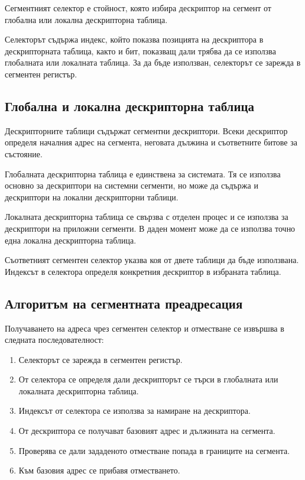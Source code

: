 \begin{defn}
Сегментният селектор е стойност, която избира дескриптор на сегмент от глобална или локална дескрипторна таблица.
\end{defn}

Селекторът съдържа индекс, който показва позицията на дескриптора в дескрипторната таблица, както и бит, показващ дали трябва да се използва глобалната или локалната таблица. За да бъде използван, селекторът се зарежда в сегментен регистър.

\subsection{Глобална и локална дескрипторна таблица}\label{s:10.3.2}

Дескрипторните таблици съдържат сегментни дескриптори. Всеки дескриптор определя началния адрес на сегмента, неговата дължина и съответните битове за състояние.

Глобалната дескрипторна таблица е единствена за системата. Тя се използва основно за дескриптори на системни сегменти, но може да съдържа и дескриптори на локални дескрипторни таблици.

Локалната дескрипторна таблица се свързва с отделен процес и се използва за дескриптори на приложни сегменти. В даден момент може да се използва точно една локална дескрипторна таблица.

Съответният сегментен селектор указва коя от двете таблици да бъде използвана. Индексът в селектора определя конкретния дескриптор в избраната таблица.

\subsection{Алгоритъм на сегментната преадресация}\label{s:10.3.3}

Получаването на адреса чрез сегментен селектор и отместване се извършва в следната последователност:

\begin{enumerate}
    \item Селекторът се зарежда в сегментен регистър.
    \item От селектора се определя дали дескрипторът се търси в глобалната или локалната дескрипторна таблица.
    \item Индексът от селектора се използва за намиране на дескриптора.
    \item От дескриптора се получават базовият адрес и дължината на сегмента.
    \item Проверява се дали зададеното отместване попада в границите на сегмента.
    \item Към базовия адрес се прибавя отместването.
\end{enumerate}


